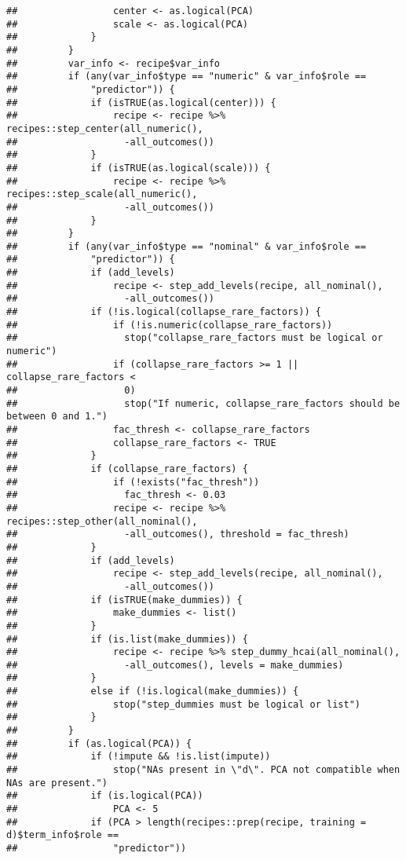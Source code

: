 \documentclass[
]{article}
\begin{document}
\begin{verbatim}
##                 center <- as.logical(PCA)
##                 scale <- as.logical(PCA)
##             }
##         }
##         var_info <- recipe$var_info
##         if (any(var_info$type == "numeric" & var_info$role == 
##             "predictor")) {
##             if (isTRUE(as.logical(center))) {
##                 recipe <- recipe %>% recipes::step_center(all_numeric(), 
##                   -all_outcomes())
##             }
##             if (isTRUE(as.logical(scale))) {
##                 recipe <- recipe %>% recipes::step_scale(all_numeric(), 
##                   -all_outcomes())
##             }
##         }
##         if (any(var_info$type == "nominal" & var_info$role == 
##             "predictor")) {
##             if (add_levels) 
##                 recipe <- step_add_levels(recipe, all_nominal(), 
##                   -all_outcomes())
##             if (!is.logical(collapse_rare_factors)) {
##                 if (!is.numeric(collapse_rare_factors)) 
##                   stop("collapse_rare_factors must be logical or numeric")
##                 if (collapse_rare_factors >= 1 || collapse_rare_factors < 
##                   0) 
##                   stop("If numeric, collapse_rare_factors should be between 0 and 1.")
##                 fac_thresh <- collapse_rare_factors
##                 collapse_rare_factors <- TRUE
##             }
##             if (collapse_rare_factors) {
##                 if (!exists("fac_thresh")) 
##                   fac_thresh <- 0.03
##                 recipe <- recipe %>% recipes::step_other(all_nominal(), 
##                   -all_outcomes(), threshold = fac_thresh)
##             }
##             if (add_levels) 
##                 recipe <- step_add_levels(recipe, all_nominal(), 
##                   -all_outcomes())
##             if (isTRUE(make_dummies)) {
##                 make_dummies <- list()
##             }
##             if (is.list(make_dummies)) {
##                 recipe <- recipe %>% step_dummy_hcai(all_nominal(), 
##                   -all_outcomes(), levels = make_dummies)
##             }
##             else if (!is.logical(make_dummies)) {
##                 stop("step_dummies must be logical or list")
##             }
##         }
##         if (as.logical(PCA)) {
##             if (!impute && !is.list(impute)) 
##                 stop("NAs present in \"d\". PCA not compatible when NAs are present.")
##             if (is.logical(PCA)) 
##                 PCA <- 5
##             if (PCA > length(recipes::prep(recipe, training = d)$term_info$role == 
##                 "predictor")) 

\end{verbatim}
\end{document}
